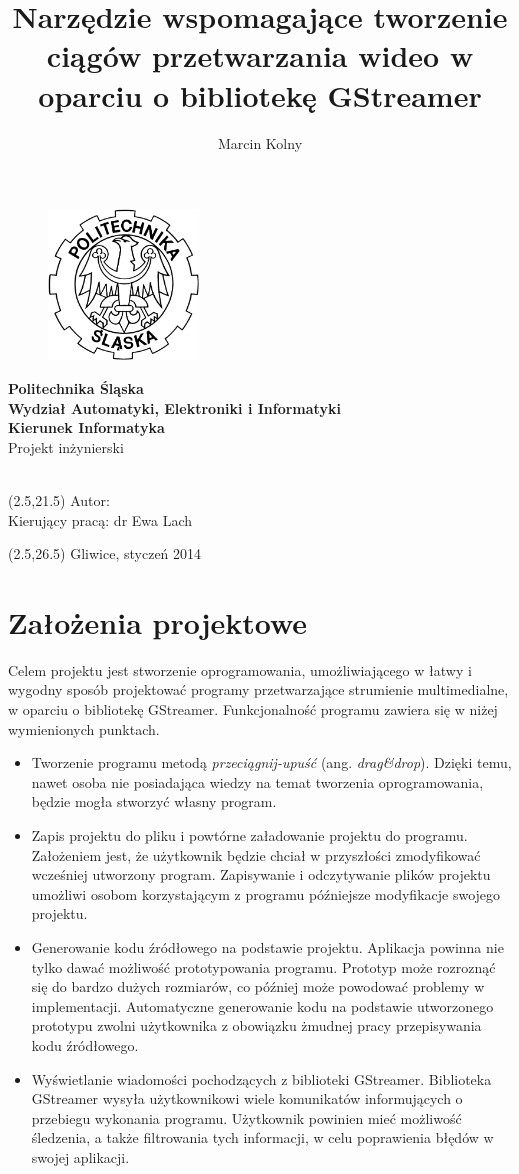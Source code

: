 \documentclass[12pt]{article}
\title{Narzędzie wspomagające tworzenie ciągów przetwarzania wideo w oparciu o bibliotekę GStreamer}
\author{Marcin Kolny}
\renewcommand{\maketitle}{
  \begin{titlepage}
    \begin{figure}  
      \includegraphics[width=40mm]{img/polsl-logo.png}
    \end{figure}
    \begin{center}
      \begingroup
      \fontsize{18pt}{21pt}\selectfont
      \textbf{Politechnika Śląska\\
        Wydział Automatyki, Elektroniki i Informatyki\\
        Kierunek Informatyka}\\
      \vspace{22mm}
      Projekt inżynierski\\
      \vspace{22mm}
      \endgroup
      \begingroup
      \fontsize{14pt}{17pt}\selectfont
      \thetitle \\
      \endgroup
      \vspace{30mm}
    \end{center}
    \begin{textblock}{14}(2.5,21.5)
      \fontsize{14pt}{17pt}\selectfont
      Autor: \theauthor \\
      Kierujący pracą: dr Ewa Lach\\
    \end{textblock}
    \begin{textblock}{20}(2.5,26.5)
      \fontsize{14pt}{17pt}\selectfont
      Gliwice, styczeń 2014\\
    \end{textblock}

  \end{titlepage}
}
\begin{document}
\maketitle
\tableofcontents
\cleardoublepage
\section{Założenia projektowe}
Celem projektu jest stworzenie oprogramowania, umożliwiającego w łatwy i wygodny sposób projektować programy przetwarzające strumienie multimedialne, w oparciu o bibliotekę GStreamer. Funkcjonalność programu zawiera się w niżej wymienionych punktach.
\begin{itemize}
 \setlength{\itemsep}{0em}
\item Tworzenie programu metodą \textit{przeciągnij-upuść} (ang. \textit{drag\&drop}). Dzięki temu, nawet osoba nie posiadająca wiedzy na temat tworzenia oprogramowania, będzie mogła stworzyć własny program.
\item Zapis projektu do pliku i powtórne załadowanie projektu do programu. Założeniem jest, że użytkownik będzie chciał w przyszłości zmodyfikować wcześniej utworzony program. Zapisywanie i odczytywanie plików projektu umożliwi osobom korzystającym z programu późniejsze modyfikacje swojego projektu.
\item Generowanie kodu źródłowego na podstawie projektu. Aplikacja powinna nie tylko dawać możliwość prototypowania programu. Prototyp może rozroznąć się do bardzo dużych rozmiarów, co później może powodować problemy w implementacji. Automatyczne generowanie kodu na podstawie utworzonego prototypu zwolni użytkownika z obowiązku żmudnej pracy przepisywania kodu źródłowego.
\item Wyświetlanie wiadomości pochodzących z biblioteki GStreamer. Biblioteka GStreamer wysyła użytkownikowi wiele komunikatów informujących o przebiegu wykonania programu. Użytkownik powinien mieć możliwość śledzenia, a także filtrowania tych informacji, w celu poprawienia błędów w swojej aplikacji.
\end{itemize}
\cleardoublepage
\end{document}
